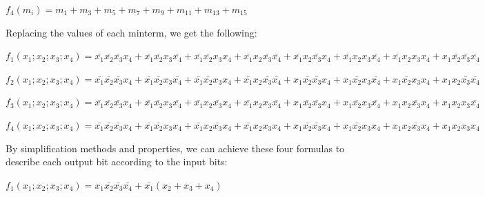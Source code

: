 \begin{center}
$f_{4}(m_{i})=m_{1}+m_{3}+m_{5}+m_{7}+m_{9}+m_{11}+m_{13}+m_{15}$
\par\end{center}

Replacing the values of each minterm, we get the following:
\begin{center}
$f_{1}(x_{1};x_{2};x_{3};x_{4})=\bar{x_{1}}\bar{x_{2}}\bar{x_{3}}x_{4}+\bar{x_{1}}\bar{x_{2}}x_{3}\bar{x_{4}}+\bar{x_{1}}\bar{x_{2}}x_{3}x_{4}+\bar{x_{1}}x_{2}\bar{x_{3}}\bar{x_{4}}+\bar{x_{1}}x_{2}\bar{x_{3}}x_{4}+\bar{x_{1}}x_{2}x_{3}\bar{x_{4}}+\bar{x_{1}}x_{2}x_{3}x_{4}+x_{1}\bar{x_{2}}\bar{x_{3}}\bar{x_{4}}$
\par\end{center}

\begin{center}
$f_{2}(x_{1};x_{2};x_{3};x_{4})=\bar{x_{1}}\bar{x_{2}}\bar{x_{3}}x_{4}+\bar{x_{1}}\bar{x_{2}}x_{3}\bar{x_{4}}+\bar{x_{1}}\bar{x_{2}}x_{3}x_{4}+\bar{x_{1}}x_{2}\bar{x_{3}}\bar{x_{4}}+x_{1}\bar{x_{2}}\bar{x_{3}}x_{4}+x_{1}\bar{x_{2}}x_{3}\bar{x_{4}}+x_{1}\bar{x_{2}}x_{3}x_{4}+x_{1}x_{2}\bar{x_{3}}\bar{x_{4}}$
\par\end{center}

\begin{center}
$f_{3}(x_{1};x_{2};x_{3};x_{4})=\bar{x_{1}}\bar{x_{2}}\bar{x_{3}}x_{4}+\bar{x_{1}}\bar{x_{2}}x_{3}\bar{x_{4}}+\bar{x_{1}}x_{2}\bar{x_{3}}x_{4}+\bar{x_{1}}x_{2}x_{3}\bar{x_{4}}+x_{1}\bar{x_{2}}\bar{x_{3}}x_{4}+x_{1}\bar{x_{2}}x_{3}\bar{x_{4}}+x_{1}x_{2}\bar{x_{3}}x_{4}+x_{1}x_{2}x_{3}\bar{x_{4}}$
\par\end{center}

\begin{center}
$f_{4}(x_{1};x_{2};x_{3};x_{4})=\bar{x_{1}}\bar{x_{2}}\bar{x_{3}}x_{4}+\bar{x_{1}}\bar{x_{2}}x_{3}x_{4}+\bar{x_{1}}x_{2}\bar{x_{3}}x_{4}+\bar{x_{1}}x_{2}x_{3}x_{4}+x_{1}\bar{x_{2}}\bar{x_{3}}x_{4}+x_{1}\bar{x_{2}}x_{3}x_{4}+x_{1}x_{2}\bar{x_{3}}x_{4}+x_{1}x_{2}x_{3}x_{4}$
\par\end{center}

By simplification methods and properties, we can achieve these
four formulas to describe each output bit according to the input bits:
\begin{center}
$f_{1}(x_{1};x_{2};x_{3};x_{4})=x_{1}\bar{x_{2}}\bar{x_{3}}\bar{x_{4}}+\bar{x_{1}}(x_{2}+x_{3}+x_{4})$
\par\end{center}

